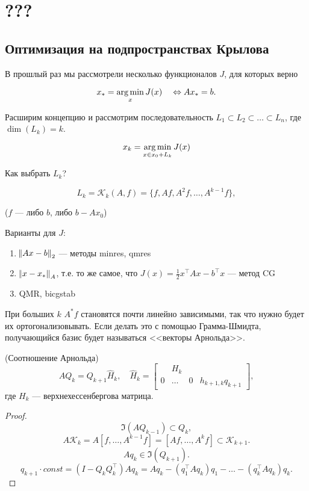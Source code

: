 \section{???}

\subsection{Оптимизация на подпространствах Крылова}

В прошлый раз мы рассмотрели несколько функционалов $J$, для которых верно

\[
    x_* = \operatorname*{\arg \min}_x J(x) \quad\Leftrightarrow A x_* = b.
\]

Расширим концепцию и рассмотрим последовательность
$L_1 \subset L_2 \subset \dots \subset L_n$, где $\dim(L_k) = k$.

\[
    x_k = \operatorname*{\arg \min}_{x \in x_0 + L_k} J(x)
\]

Как выбрать $L_k$?

\[
    L_k = \mathcal{K}_k(A, f) = \{ f, Af, A^2 f, \dots, A^{k - 1} f \},
\]

($f$ --- либо $b$, либо $b - A x_0$)

Варианты для $J$:

\begin{enumerate}
    \item $\norm{A x - b}_2$ --- методы minres, qmres
    \item $\norm{x - x_*}_A$, т.е. то же самое, что
        $J(x) = \frac{1}{2} x^\top A x - b^\top x$ --- метод CG
    \item QMR, bicgstab
\end{enumerate}

При больших $k$ $A^* f$ становятся почти линейно зависимыми, так что нужно будет
их ортогонализовывать. Если делать это с помощью Грамма-Шмидта, получающийся
базис будет называться <<векторы Арнольда>>.

\begin{point} (Соотношение Арнольда)
    \[
        A Q_k = Q_{k + 1} \hat{H}_k, \quad \hat{H}_k = \begin{bmatrix}
            & H_k & \\
            0 & \dots & 0 & h_{k + 1, k} q_{k + 1}
        \end{bmatrix},
    \]
    где $H_k$ --- верхнехессенбергова матрица.
\end{point}

\begin{proof}
    \[
        \Im(A Q_{k - 1}) \subset Q_k,
    \]
    \[
        A \mathcal{K}_k = A [f, \dots, A^{k - 1} f]
        = [A f, \dots, A^k f] \subset \mathcal{K}_{k + 1}.
    \]
    \[
        A q_k \in \Im(Q_{k + 1}).
    \]
    \[
        q_{k + 1} \cdot const = (I - Q_k Q_k^\top) A q_k
        = A q_k - (q_1^\top A q_k) q_1 - \dots - (q_k^\top A q_k) q_k.
    \]
\end{proof}

